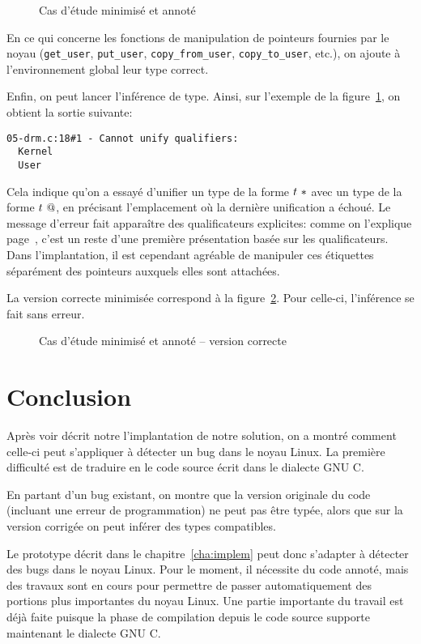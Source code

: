 \begin{figure}

\caption{Cas d'étude minimisé et annoté}
\label{fig:ex-drm}
\end{figure}

En ce qui concerne les fonctions de manipulation de pointeurs fournies
par le noyau (\texttt{get\_user}, \texttt{put\_user},
\texttt{copy\_from\_user}, \texttt{copy\_to\_user}, etc.), on ajoute à
l'environnement global leur type correct.

Enfin, on peut lancer l'inférence de type. Ainsi, sur l'exemple de la
figure~\ref{fig:ex-drm}, on obtient la sortie suivante:

\begin{Verbatim}
05-drm.c:18#1 - Cannot unify qualifiers:
  Kernel
  User
\end{Verbatim}

Cela indique qu'on a essayé d'unifier un type de la forme $t~*$ avec un
type de la forme $t~@$, en précisant l'emplacement où la dernière
unification a échoué. Le message d'erreur fait apparaître des qualificateurs
explicites: comme on l'explique page~\pageref{page:qualifs-pas-qualifs}, c'est
un reste d'une première présentation basée sur les qualificateurs.
Dans l'implantation, il est cependant agréable de manipuler ces étiquettes
séparément des pointeurs auxquels elles sont attachées.

La version correcte minimisée correspond à la figure~\ref{fig:ex-drm-ok}. Pour
celle-ci, l'inférence se fait sans erreur.


\begin{figure}


    \caption{Cas d'étude minimisé et annoté -- version correcte}
    \label{fig:ex-drm-ok}

\end{figure}

\section*{Conclusion}

Après voir décrit notre l'implantation de notre solution, on a montré comment
celle-ci peut s'appliquer à détecter un bug dans le noyau Linux. La première
difficulté est de traduire en \newspeak le code source écrit dans le dialecte
GNU C.

En partant d'un bug existant, on montre que la version originale du code
(incluant une erreur de programmation) ne peut pas être typée, alors que sur la
version corrigée on peut inférer des types compatibles.

Le prototype décrit dans le chapitre~\ref{cha:implem} peut donc s'adapter à
détecter des bugs dans le noyau Linux. Pour le moment, il nécessite du code
annoté, mais des travaux sont en cours pour permettre de passer automatiquement
des portions plus importantes du noyau Linux. Une partie importante du travail
est déjà faite puisque la phase de compilation depuis le code source supporte
maintenant le dialecte GNU C.

